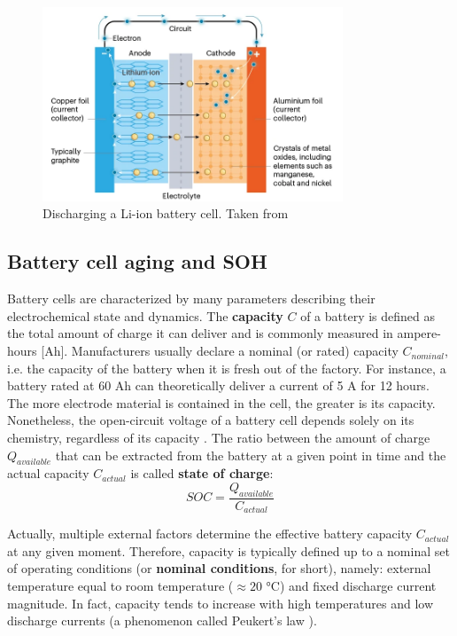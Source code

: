 \begin{figure}[hbt!]
    \centering
    \includegraphics[width=0.8\textwidth]{images/li-ion_cell}
    \caption[Discharging a Li-ion battery cell]{Discharging a Li-ion battery cell. Taken from \cite{nature_li-ion}}
    \label{fig:li-ion_cell}
\end{figure}

\subsection{Battery cell aging and SOH}
\label{sec:soh}
Battery cells are characterized by many parameters describing their electrochemical state and dynamics. The \textbf{capacity} $C$ of a battery is defined as the total amount of charge it can deliver and is commonly measured in ampere-hours [Ah]. Manufacturers usually declare a nominal (or rated) capacity $C_{nominal}$, i.e. the capacity of the battery when it is fresh out of the factory. For instance, a battery rated at 60 Ah can theoretically deliver a current of 5 A for 12 hours. The more electrode material is contained in the cell, the greater is its capacity. Nonetheless, the open-circuit voltage of a battery cell depends solely on its chemistry, regardless of its capacity \cite{battery_glossary}. The ratio between the amount of charge $Q_{available}$ that can be extracted from the battery at a given point in time and the actual capacity $C_{actual}$ is called \textbf{state of charge}:
\begin{equation}
\label{eq:soc}
    SOC = \frac{Q_{available}}{C_{actual}}
\end{equation}

Actually, multiple external factors determine the effective battery capacity $C_{actual}$ at any given moment. Therefore, capacity is typically defined up to a nominal set of operating conditions (or \textbf{nominal conditions}, for short), namely: external temperature equal to room temperature ($\approx 20$ °C) and fixed discharge current magnitude. In fact, capacity tends to increase with high temperatures \cite{C_depends_on_T} and low discharge currents (a phenomenon called Peukert's law \cite{peukert}).

